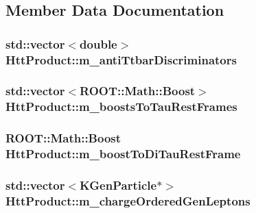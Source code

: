 \subsection{Member Data Documentation}
\hypertarget{classHttProduct_acabaf148b0c74108cceed4250817b299}{
\subsubsection[{m\_\-antiTtbarDiscriminators}]{\setlength{\rightskip}{0pt plus 5cm}std::vector$<$double$>$ {\bf HttProduct::m\_\-antiTtbarDiscriminators}}}
\label{classHttProduct_acabaf148b0c74108cceed4250817b299}
\hypertarget{classHttProduct_ad47b7fcac7b589b6a4f9a3f8f6816388}{
\subsubsection[{m\_\-boostsToTauRestFrames}]{\setlength{\rightskip}{0pt plus 5cm}std::vector$<$ROOT::Math::Boost$>$ {\bf HttProduct::m\_\-boostsToTauRestFrames}}}
\label{classHttProduct_ad47b7fcac7b589b6a4f9a3f8f6816388}
\hypertarget{classHttProduct_ac7288a01a3f35dc7b5ef2d0b4c713cd8}{
\subsubsection[{m\_\-boostToDiTauRestFrame}]{\setlength{\rightskip}{0pt plus 5cm}ROOT::Math::Boost {\bf HttProduct::m\_\-boostToDiTauRestFrame}}}
\label{classHttProduct_ac7288a01a3f35dc7b5ef2d0b4c713cd8}
\hypertarget{classHttProduct_a70bf9c026bb6be12a25a0e793215511f}{
\subsubsection[{m\_\-chargeOrderedGenLeptons}]{\setlength{\rightskip}{0pt plus 5cm}std::vector$<$KGenParticle$\ast$$>$ {\bf HttProduct::m\_\-chargeOrderedGenLeptons}}}
